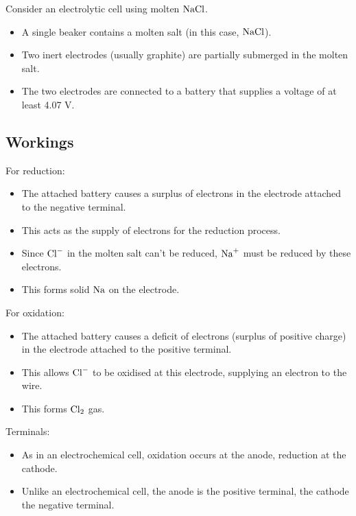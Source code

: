 \documentclass[a4paper,11pt]{article}
\begin{document}
Consider an electrolytic cell using molten $\ce{NaCl}$.

\begin{itemize}
\item A single beaker contains a molten salt (in this case, $\ce{NaCl}$).
\item Two inert electrodes (usually graphite) are partially submerged in the
	molten salt.
\item The two electrodes are connected to a battery that supplies a voltage of
	at least 4.07 V.
\end{itemize}

\subsection{Workings}

For reduction:

\begin{itemize}
\item The attached battery causes a surplus of electrons in the electrode
	attached to the negative terminal.
\item This acts as the supply of electrons for the reduction process.
\item Since $\ce{Cl-}$ in the molten salt can't be reduced, $\ce{Na+}$ must be
	reduced by these electrons.
\item This forms solid $\ce{Na}$ on the electrode.
\end{itemize}

For oxidation:

\begin{itemize}
\item The attached battery causes a deficit of electrons (surplus of positive
	charge) in the electrode attached to the positive terminal.
\item This allows $\ce{Cl-}$ to be oxidised at this electrode, supplying an
	electron to the wire.
\item This forms $\ce{Cl2}$ gas.
\end{itemize}

Terminals:

\begin{itemize}
\item As in an electrochemical cell, oxidation occurs at the anode, reduction
	at the cathode.
\item Unlike an electrochemical cell, the anode is the positive terminal, the
	cathode the negative terminal.
\end{itemize}
\end{document}
